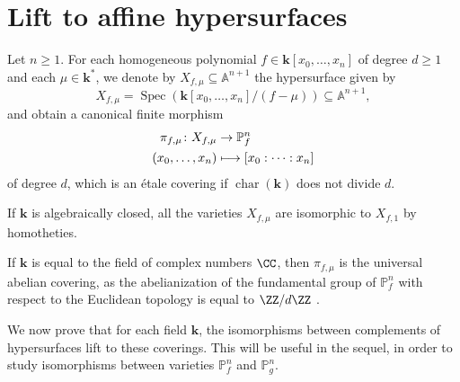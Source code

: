 \documentclass[JEP,XML,SOM,Unicode,NoFloatCountersInSection,published]{cedram}
\newcommand\mto{\mathchoice{\longmapsto}{\mapsto}{\mapsto}{\mapsto}}
\theoremstyle{definition}
\newcommand\A{{\mathbb A}}\let\AA\A
\renewcommand\k{{\mathbf k}}
\newcommand\p{{\mathbb P}}\let\PP\p
\newcommand{\kk}{\mathbf{k}}
\DeclareMathOperator{\car}{char}
\DeclareMathOperator{\Spec}{Spec}
\begin{document}
\section{Lift to affine hypersurfaces}
Let $n\geq 1$. For each homogeneous polynomial $f\in \kk[x_0,\ldots,x_n]$ of degree $d\ge 1$ and each $\mu\in \k^*$, we denote by $X_{f,\mu}\subseteq \A^{n+1}$ the hypersurface given by
\[
X_{f,\mu}=\Spec(\k[x_0,\ldots,x_n]/(f-\mu)) \subseteq \AA^{n+1},
\]
and obtain a canonical finite morphism
\begin{align*}
\pi_{f,\mu}\colon X_{f, \mu}&\to \p^n_f\\
(x_0,\ldots,x_n)&\mto [x_0:\cdots:x_n]
\end{align*}
of degree $d$, which is an étale covering if $\car(\kk)$ does not divide $d$.

If $\kk$ is algebraically closed, all the varieties $X_{f,\mu}$ are isomorphic to $X_{f,1}$ by homotheties.

If $\k$ is equal to the field of complex numbers $\CC$, then $\pi_{f,\mu}$
is the universal abelian covering, as the abelianization of the
fundamental group of $\p^n_f$ with respect to the Euclidean topology is equal to $\ZZ / d \ZZ$ \cite[Prop.\,2.3]{Li2005Lectures-on-topolo}.

We now prove that for each field $\kk$, the isomorphisms between complements of hypersurfaces lift to these coverings. This will be useful in the sequel, in order to study isomorphisms between varieties $\p^n_f$ and $\p^n_g$.
\end{document}
